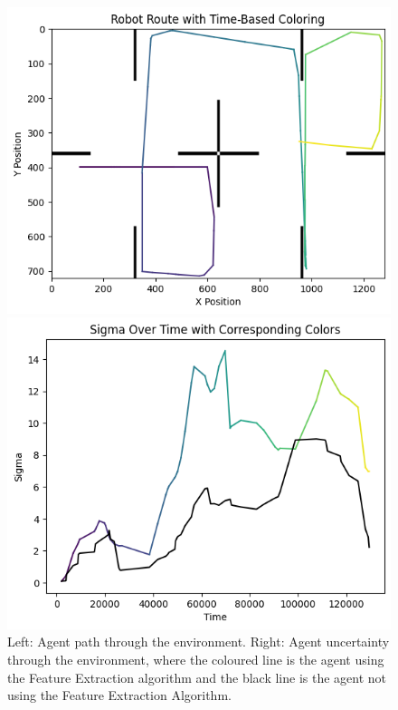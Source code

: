 \documentclass[12pt]{article}
\begin{document}
\begin{figure}[h]
    \centering
    \begin{minipage}{0.45\textwidth}
        \centering
        \includegraphics[width=\linewidth]{FE_EKF1}
    \end{minipage}
    \begin{minipage}{0.45\textwidth}
        \centering
        \includegraphics[width=\linewidth]{FE_EKF2}
    \end{minipage}
    \caption[Short caption]{Left: Agent path through the environment. Right: Agent uncertainty through the environment, where the coloured line
    is the agent using the Feature Extraction algorithm and the black line is the agent not using the Feature Extraction Algorithm.}
    \label{fig:FE_EKF_graphs}
\end{figure}
\end{document}
